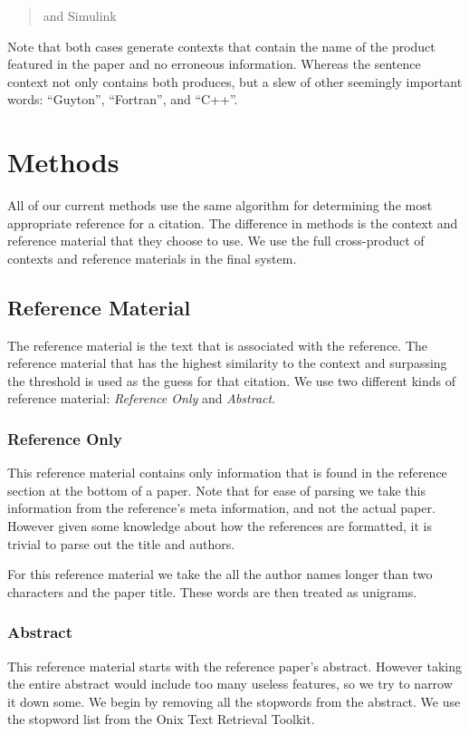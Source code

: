 \documentclass[10pt, conference, compsocconf]{IEEEtran}
\begin{document}
\begin{quote}
and Simulink
\end{quote}

Note that both cases generate contexts that contain the name of the product featured in the paper and no erroneous information. Whereas the
sentence context not only contains both produces, but a slew of other seemingly important words: ``Guyton'', ``Fortran'', and ``C++''.

\section{Methods}\label{sec:methods}
All of our current methods use the same algorithm for determining the most appropriate reference for a citation.
The difference in methods is the context and reference material that they choose to use.
We use the full cross-product of contexts and reference materials in the final system.

\subsection{Reference Material}
The reference material is the text that is associated with the reference.
The reference material that has the highest similarity to the context and surpassing the threshold is
used as the guess for that citation.
We use two different kinds of reference material: \textit{Reference Only} and \textit{Abstract}.

\subsubsection{Reference Only}
This reference material contains only information that is found in the reference section at the bottom of a paper.
Note that for ease of parsing we take this information from the reference's meta information, and not the actual paper. However given
some knowledge about how the references are formatted, it is trivial to parse out the title and authors.

For this reference material we take the all the author names longer than two characters and the paper title.
These words are then treated as unigrams.

\subsubsection{Abstract}
This reference material starts with the reference paper's abstract. However taking the entire abstract would include too many
useless features, so we try to narrow it down some. We begin by removing all the stopwords from the abstract. We use
the stopword list from the Onix Text Retrieval Toolkit\cite{stopwords}.
\end{document}
